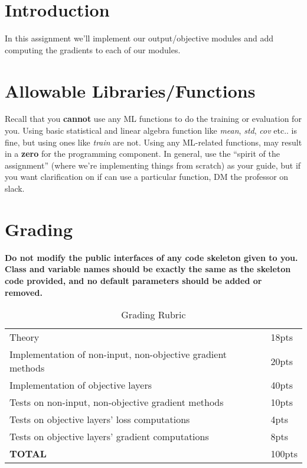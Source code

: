 \documentclass[12pt]{article}
\begin{document}
\maketitle


\section*{Introduction}
In this assignment we'll implement our output/objective modules and add computing the gradients to each of our modules.

\section*{Allowable Libraries/Functions}
Recall that you \textbf{cannot} use any ML functions to do the training or evaluation for you.  Using basic statistical and linear algebra function like \emph{mean}, \emph{std}, \emph{cov} etc.. is fine, but using ones like \emph{train} are not. Using any ML-related functions, may result in a \textbf{zero} for the programming component.  In general, use the ``spirit of the assignment'' (where we're implementing things from scratch) as your guide, but if you want clarification on if can use a particular function, DM the professor on slack.


\section*{Grading}
\textbf{Do not modify the public interfaces of any code skeleton given to you. Class and variable names should be exactly the same as the skeleton code provided, and no default parameters should be added or removed.}
\begin{table}[h]
\begin{center}
\begin{tabular}{|l|l|}
\hline
Theory & 18pts\\
Implementation of non-input, non-objective gradient methods & 20pts\\
Implementation of objective layers & 40pts\\
Tests on non-input, non-objective gradient methods & 10pts\\
Tests on objective layers' loss computations & 4pts\\
Tests on objective layers' gradient computations & 8pts\\
\hline
\textbf{TOTAL} & 100pts \\
\hline
\end{tabular}
\caption{Grading Rubric}
\end{center}
\end{table}
\end{document}
